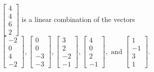 \begin{exercise}
\begin{exerciseStatement}
  \end{exerciseStatement}
  \begin{exerciseAnswer}
   \(\left[\begin{array}{c}
4 \\
4 \\
6 \\
2
\end{array}\right]\) 
  	 is  
	a linear combination of the vectors \(\left[\begin{array}{c}
-2 \\
0 \\
4 \\
-2
\end{array}\right] , \left[\begin{array}{c}
0 \\
0 \\
-3 \\
-3
\end{array}\right] , \left[\begin{array}{c}
3 \\
2 \\
-2 \\
-1
\end{array}\right] , \left[\begin{array}{c}
4 \\
0 \\
2 \\
-1
\end{array}\right] , \text{ and } \left[\begin{array}{c}
1 \\
-1 \\
3 \\
1
\end{array}\right]\).

	
  


  \end{exerciseAnswer}
\end{exercise}